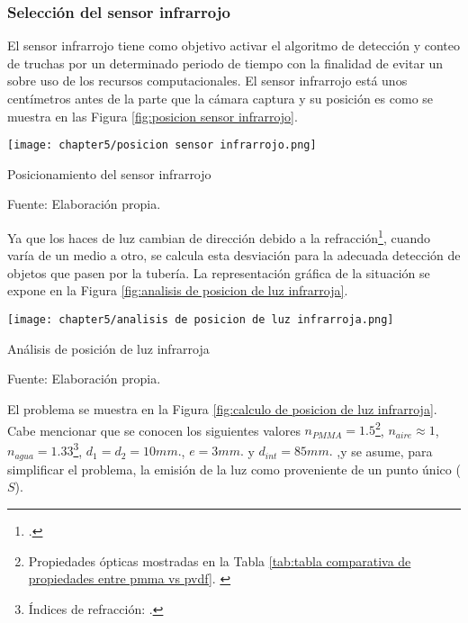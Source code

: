 \subsubsection{Selección del sensor infrarrojo}

El sensor infrarrojo tiene como objetivo activar el algoritmo de detección y conteo de truchas por un determinado periodo de tiempo con la finalidad de evitar un sobre uso de los recursos computacionales. El sensor infrarrojo está unos centímetros antes de la parte que la cámara captura y su posición es como se muestra en las Figura \ref{fig:posicion sensor infrarrojo}.

\begin{myfigure}[H]
	\centering
	\texttt{[image: chapter5/posicion sensor infrarrojo.png]}
	\caption{Posicionamiento del sensor infrarrojo}
	\begin{myflushleftportland}
		Fuente: Elaboración propia.
	\end{myflushleftportland}
	\label{fig:posicion sensor infrarrojo}
\end{myfigure}

Ya que los haces de luz cambian de dirección debido a la refracción\footnote{\cite{Hecht2017}.}, cuando varía de un medio a otro, se calcula esta desviación para la adecuada detección de objetos que pasen por la tubería. La representación gráfica de la situación se expone en la Figura \ref{fig:analisis de posicion de luz infrarroja}.

\begin{myfigure}[H]
	\centering
	\texttt{[image: chapter5/analisis de posicion de luz infrarroja.png]}
	\caption{Análisis de posición de luz infrarroja}
	\begin{myflushleftportland}
		Fuente: Elaboración propia.
	\end{myflushleftportland}
	\label{fig:analisis de posicion de luz infrarroja}
\end{myfigure}

El problema se muestra en la Figura \ref{fig:calculo de posicion de luz infrarroja}. Cabe mencionar que se conocen los siguientes valores $n_{PMMA}=1.5$\footnote{Propiedades ópticas mostradas en la Tabla \ref{tab:tabla comparativa de propiedades entre pmma vs pvdf}. \cite{Berins1991}}, $n_{aire}\approx1$, $n_{agua}=1.33$\footnote{Índices de refracción: \cite{Hecht2017}.}, $d_{1}=d_{2}=10 mm.$, $e=3 mm.$ y $d_{int}=85 mm.$ ,y se asume, para simplificar el problema, la emisión de la luz como proveniente de un punto único ($S$).

